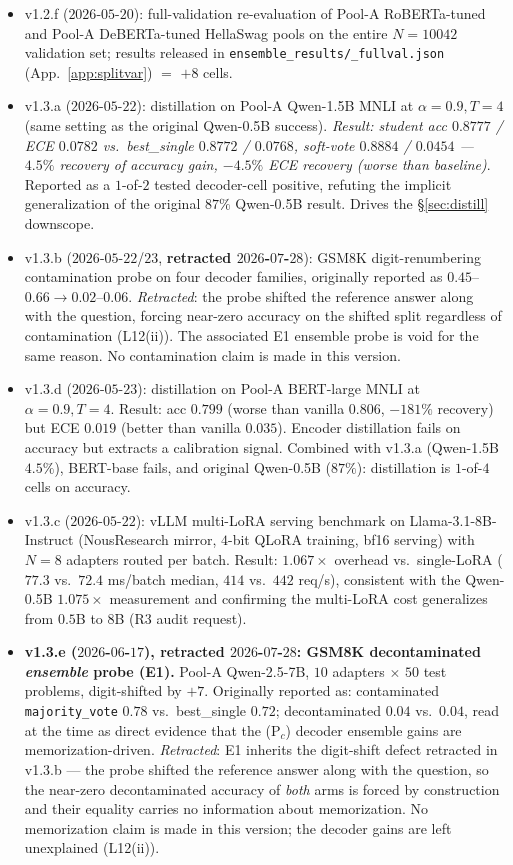 \documentclass[11pt]{article}
\begin{document}
\begin{itemize}[leftmargin=*]
\item v1.2.f ($2026$-$05$-$20$): full-validation re-evaluation of Pool-A RoBERTa-tuned and Pool-A DeBERTa-tuned HellaSwag pools on the entire $N{=}10042$ validation set; results released in \texttt{ensemble\_\allowbreak results/\allowbreak *\_\allowbreak fullval.\allowbreak json} (App.~\ref{app:splitvar}) $=$ $+8$ cells.
\item v1.3.a ($2026$-$05$-$22$): distillation on Pool-A Qwen-1.5B MNLI at $\alpha{=}0.9, T{=}4$ (same setting as the original Qwen-0.5B success). \emph{Result: student acc $0.8777$ / ECE $0.0782$ vs.\ best\_single $0.8772$ / $0.0768$, soft-vote $0.8884$ / $0.0454$ — $4.5\%$ recovery of accuracy gain, $-4.5\%$ ECE recovery (worse than baseline)}. Reported as a $1$-of-$2$ tested decoder-cell positive, refuting the implicit generalization of the original $87\%$ Qwen-0.5B result. Drives the \S\ref{sec:distill} downscope.
\item v1.3.b ($2026$-$05$-$22$/$23$, \textbf{retracted $2026$-$07$-$28$}): GSM8K digit-renumbering contamination probe on four decoder families, originally reported as $0.45$--$0.66\to0.02$--$0.06$. \emph{Retracted}: the probe shifted the reference answer along with the question, forcing near-zero accuracy on the shifted split regardless of contamination (L12(ii)). The associated E1 ensemble probe is void for the same reason. No contamination claim is made in this version.
\item v1.3.d ($2026$-$05$-$23$): distillation on Pool-A BERT-large MNLI at $\alpha{=}0.9, T{=}4$. Result: acc $0.799$ (worse than vanilla $0.806$, $-181\%$ recovery) but ECE $0.019$ (better than vanilla $0.035$). Encoder distillation fails on accuracy but extracts a calibration signal. Combined with v1.3.a (Qwen-1.5B $4.5\%$), BERT-base fails, and original Qwen-0.5B ($87\%$): distillation is $1$-of-$4$ cells on accuracy.
\item v1.3.c ($2026$-$05$-$22$): vLLM multi-LoRA serving benchmark on Llama-3.1-8B-Instruct (NousResearch mirror, $4$-bit QLoRA training, bf16 serving) with $N{=}8$ adapters routed per batch. Result: $1.067{\times}$ overhead vs.\ single-LoRA ($77.3$ vs.\ $72.4$ ms/batch median, $414$ vs.\ $442$ req/s), consistent with the Qwen-0.5B $1.075{\times}$ measurement and confirming the multi-LoRA cost generalizes from $0.5$B to $8$B (R3 audit request).
\item \textbf{v1.3.e ($2026$-$06$-$17$), \textbf{retracted $2026$-$07$-$28$}: GSM8K decontaminated \emph{ensemble} probe (E1).} Pool-A Qwen-2.5-7B, $10$ adapters $\times$ $50$ test problems, digit-shifted by $+7$. Originally reported as: contaminated \texttt{majority\_vote} $0.78$ vs.\ best\_single $0.72$; decontaminated $0.04$ vs.\ $0.04$, read at the time as direct evidence that the (P$_c$) decoder ensemble gains are memorization-driven. \emph{Retracted}: E1 inherits the digit-shift defect retracted in v1.3.b --- the probe shifted the reference answer along with the question, so the near-zero decontaminated accuracy of \emph{both} arms is forced by construction and their equality carries no information about memorization. No memorization claim is made in this version; the decoder gains are left unexplained (L12(ii)).

\end{itemize}
\end{document}
